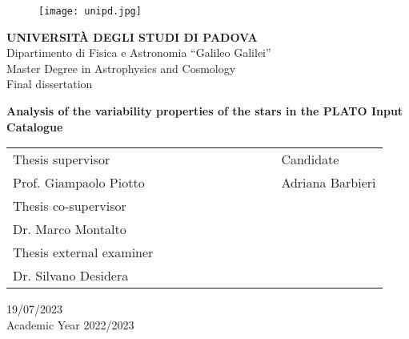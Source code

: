 \begin{titlepage}
\begin{figure}[hbtp]
\centering
\texttt{[image: unipd.jpg]}
\end{figure}
\begin{center}
{{\Large{\textsc{\bf UNIVERSIT\`A DEGLI STUDI DI PADOVA}}}\\}
\vspace{8mm}
{\Large{Dipartimento di Fisica e Astronomia ``Galileo Galilei''}} \\
\vspace{3mm}
{\Large{{Master Degree in Astrophysics and Cosmology}}}\\
\vspace{10mm}
{\Large{{Final dissertation}}}\\
\vspace{10mm}
\begin{spacing}{2}
{\LARGE \textbf{Analysis of the variability properties of the stars in the PLATO Input Catalogue}}\\
\end{spacing}
\end{center}
\vspace{10mm}
\begin{spacing}{2}
\begin{tabular}{ l  c  c c c  cc c c c l }
{\large{Thesis supervisor}} &&&&&&&&&& {\large{Candidate}}\\
{\large{Prof. Giampaolo Piotto}} &&&&&&&&&& {\large{Adriana Barbieri}}\\
{\large{Thesis co-supervisor}}\\
{\large{Dr. Marco Montalto}}\\
{\large{Thesis external examiner}}\\
{\large{Dr. Silvano Desidera}}\\
\end{tabular}
\end{spacing}
\vspace{8 mm}

\begin{center}
{\Large{19/07/2023}}\\
\vspace{3mm}
{\Large{Academic Year 2022/2023}}
\end{center}
\end{titlepage}
